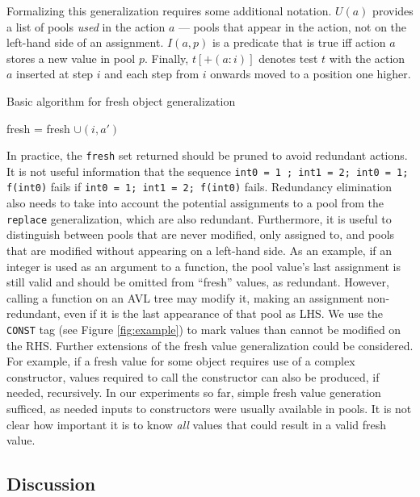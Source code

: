 Formalizing this generalization requires some additional notation.
$U(a)$ provides a list of pools \emph{used} in the action $a$ --- pools that
appear in the action, not on the left-hand side of an assignment.
$I(a,p)$ is a predicate that is true iff action $a$ stores a new value
in pool $p$.  Finally, $t[+(a: i)]$ denotes test $t$ with the action
$a$ inserted at step $i$ and each step from $i$ onwards moved to a
position one higher.

\begin{algorithm}
\caption{Basic algorithm for fresh object generalization}
\label{freshalg}
\begin{algorithmic}[1]
\State fresh = fresh $\cup (i,a')$
\EndIf
\EndFor 
\EndFor
\EndFor
{}
\end{algorithmic}
\end{algorithm}

In practice, the {\tt fresh} set returned should be pruned to avoid
redundant actions.  It is not useful information that the sequence
{\tt int0 = 1 ; int1 = 2; int0 = 1; f(int0)} fails if {\tt int0 = 1;
  int1 = 2; f(int0)} fails.  Redundancy elimination also needs to take
into account the potential assignments to a pool from the {\tt
  replace} generalization, which are also redundant.  Furthermore, it
is useful to distinguish between pools that are never modified, only
assigned to, and pools that are modified without appearing on a
left-hand side.  As an example, if an integer is used as an argument
to a function, the pool value's last assignment is still valid and
should be omitted from ``fresh'' values, as redundant.  However,
calling a function on an AVL tree may modify it, making an assignment
non-redundant, even if it is the last appearance of that pool as LHS.
We use the {\tt CONST} tag (see Figure \ref{fig:example}) to mark
values than cannot be modified on the RHS.  Further extensions of the
fresh value generalization could be considered.  For example, if a
fresh value for some object requires use of a complex constructor,
values required to call the constructor can also be produced, if
needed, recursively.  In our experiments so
far, simple fresh value generation sufficed, as needed inputs to
constructors were usually available in pools.  It is not clear how
important it is to know \emph{all} values that could result in a valid
fresh value.

\subsection{Discussion}

